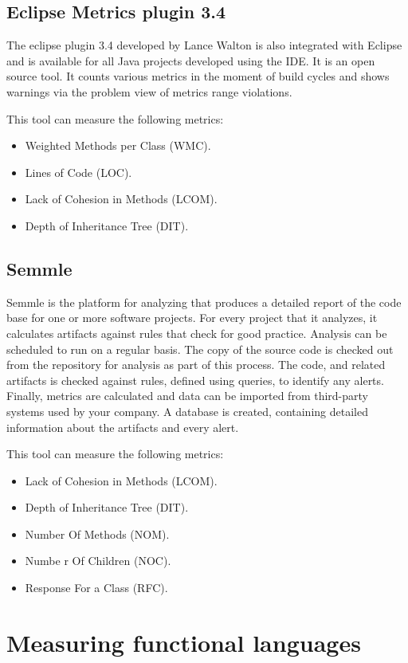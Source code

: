 \subsection{Eclipse Metrics plugin 3.4}
The eclipse plugin 3.4 developed by Lance Walton is also integrated with Eclipse and is available for all Java projects developed using the IDE. It is an open source tool. It counts various metrics in the moment of build cycles and shows warnings via the problem view of metrics range violations.

This tool can measure the following metrics:
\begin{itemize}
	\item Weighted Methods per Class (WMC).
	\item Lines of Code (LOC). 
	\item Lack of Cohesion in Methods (LCOM).
	\item Depth of Inheritance Tree (DIT).
\end{itemize}

\subsection{Semmle}

Semmle is the platform for analyzing that produces a detailed report of the code base for one or more software projects. For every project that it analyzes, it calculates artifacts against rules that check for good practice. Analysis can be scheduled to run on a regular basis. The copy of the source code is checked out from the repository for analysis as part of this process. The code, and related artifacts is checked against rules, defined using queries, to identify any alerts. Finally, metrics are calculated and data can be imported from third-party systems used by your company. A database is created, containing detailed information about the artifacts and every alert.

This tool can measure the following metrics:
\begin{itemize}
	\item Lack of Cohesion in Methods (LCOM).
	\item Depth of Inheritance Tree (DIT).
	\item Number Of Methods (NOM).
	\item Numbe r Of Children (NOC).
	\item Response For a Class (RFC).
\end{itemize}

\section{Measuring functional languages}

